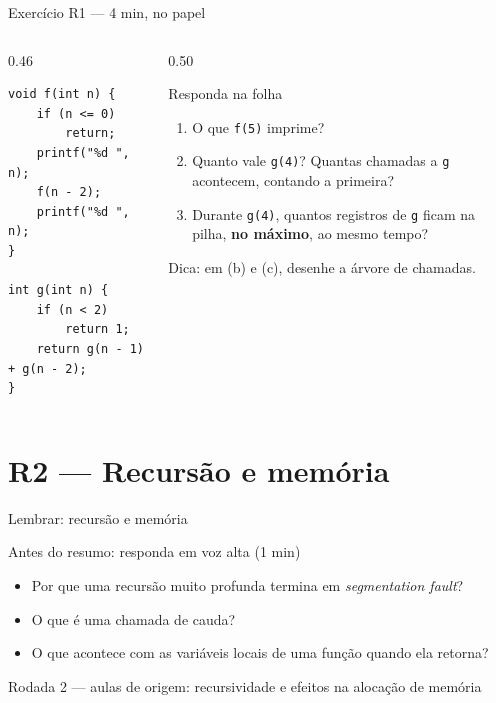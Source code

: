 \documentclass[aspectratio=169]{beamer}
\newcommand{\rodada}[4]{%
  \begin{frame}{Lembrar: #2}
    \begin{block}{Antes do resumo: responda em voz alta (1 min)}
      #4
    \end{block}
    \vfill
    {\small\textcolor{UFSGray}{Rodada #1 --- aulas de origem:} #3}
  \end{frame}}
\begin{document}
\begin{frame}[fragile]{Exercício R1 --- 4 min, no papel}
  \begin{columns}[T]
    \begin{column}{0.46\textwidth}
\begin{lstlisting}[style=numC]
void f(int n) {
    if (n <= 0)
        return;
    printf("%d ", n);
    f(n - 2);
    printf("%d ", n);
}

int g(int n) {
    if (n < 2)
        return 1;
    return g(n - 1) + g(n - 2);
}
\end{lstlisting}
    \end{column}
    \begin{column}{0.50\textwidth}
      \begin{block}{Responda na folha}
        \begin{enumerate}
          \item[(a)] O que \texttt{f(5)} imprime?
          \item[(b)] Quanto vale \texttt{g(4)}? Quantas chamadas a
            \texttt{g} acontecem, contando a primeira?
          \item[(c)] Durante \texttt{g(4)}, quantos registros de
            \texttt{g} ficam na pilha, \textbf{no máximo}, ao mesmo tempo?
        \end{enumerate}
      \end{block}
      \small Dica: em (b) e (c), desenhe a árvore de chamadas.
    \end{column}
  \end{columns}
\end{frame}

\section{R2 --- Recursão e memória}

\rodada{2}{recursão e memória}{recursividade e efeitos na alocação de memória}{
  \begin{itemize}
    \item Por que uma recursão muito profunda termina em \emph{segmentation
      fault}?
    \item O que é uma chamada de cauda?
    \item O que acontece com as variáveis locais de uma função quando ela
      retorna?
  \end{itemize}}
\end{document}
